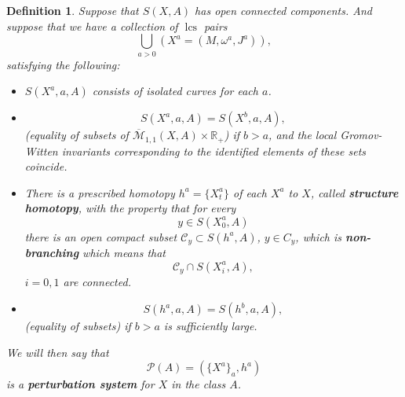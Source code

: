 \documentclass{amsart}
\numberwithin{equation}{section}
\newtheorem{definition}[equation]{Definition}
\theoremstyle{definition}
\theoremstyle{remark}
\DeclareMathOperator{\lcs}{lcs}
\begin{document}
\begin{definition} \label{def:perturbedsystem}
Suppose that $S (X,A)$ has open connected components.
And suppose that we have a collection of $\lcs$ pairs $$\bigcup _{a>0} (X ^{a} =  (M,\omega ^{a}, J ^{a}  )),$$ 
satisfying the following:
\begin{itemize}
   \item 
  $S   (X ^{a},a,A ) $ consists of isolated curves for each $a$.
\item $$S   (X ^{a},a, A ) = S   (X ^{b},a, A ),  $$ (equality of
   subsets of $ \overline{\mathcal{M}} _{1,1} (X,A) \times \mathbb{R} _{+}    $) if $b>a$, and
the local Gromov-Witten invariants corresponding to the identified elements of these sets coincide.
\item
There is a prescribed homotopy $h ^{a}= \{X ^{a}_t \}$ of each $X ^{a} $ 
to $X$, 
called \textbf{\emph{structure
homotopy}}, 
with the property that for every $$y \in S  (X ^{a}_0, A )$$
there is an open
compact subset $\mathcal{C} _{y} \subset S  (h ^{a} ,A)$, $y \in C _{y}  $,
which is 
       \textbf{\emph{non-branching}} which means that 
$$\mathcal{C} _{y}  \cap  S (X ^{a} _{i}   , A),$$ $i=0,1$ are connected.
     \item $$S   (h ^{a}, a,A) = S (h ^{b},a,A),  $$ (equality of
subsets) if $b>a$ is sufficiently large.
\end{itemize}
We will then say that $$\mathcal{P} (A) = (\{X ^{a} \} _{a}, h ^{a} )   $$ is a 
\textbf{\emph{perturbation system}} for $X$ in the class $A$.
\end{definition}


\end{document}
